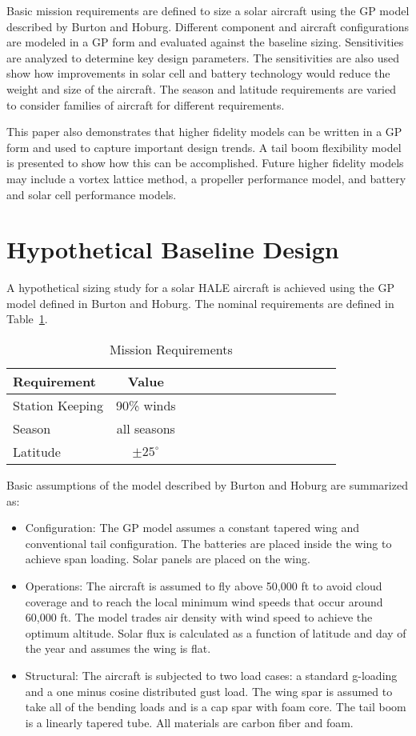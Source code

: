 \documentclass[]{aiaa-tc}%
\begin{document}
Basic mission requirements are defined to size a solar aircraft using the GP model described by Burton and Hoburg.\cite{burton_solar_2017}
Different component and aircraft configurations are modeled in a GP form and evaluated against the baseline sizing. 
Sensitivities are analyzed to determine key design parameters. 
The sensitivities are also used show how improvements in solar cell and battery technology would reduce the weight and size of the aircraft. 
The season and latitude requirements are varied to consider families of aircraft for different requirements.  

This paper also demonstrates that higher fidelity models can be written in a GP form and used to capture important design trends.  
A tail boom flexibility model is presented to show how this can be accomplished.  
Future higher fidelity models may include a vortex lattice method, a propeller performance model, and battery and solar cell performance models. 

\section{Hypothetical Baseline Design}

A hypothetical sizing study for a solar HALE aircraft is achieved using the GP model defined in Burton and Hoburg.\cite{burton_solar_2017} The nominal requirements are defined in Table~\ref{t:mreqs}.

\begin{longtable}{lccccccccccccc}
\caption{Mission Requirements}\\
\toprule
\toprule
\label{t:mreqs}
Requirement & Value \\ \hline
Station Keeping & 90\% winds \\
Season & all seasons\\
Latitude & $\pm25^{\circ}$\\
\bottomrule
\end{longtable}

Basic assumptions of the model described by Burton and Hoburg are summarized as: 

\begin{itemize}
    \item Configuration: The GP model assumes a constant tapered wing and conventional tail configuration.  The batteries are placed inside the wing to achieve span loading.  Solar panels are placed on the wing.  
    \item Operations: The aircraft is assumed to fly above 50,000 ft to avoid cloud coverage and to reach the local minimum wind speeds that occur around 60,000 ft. The model trades air density with wind speed to achieve the optimum altitude. Solar flux is calculated as a function of latitude and day of the year and assumes the wing is flat. 
    \item Structural: The aircraft is subjected to two load cases: a standard g-loading and a one minus cosine distributed gust load.  The wing spar is assumed to take all of the bending loads and is a cap spar with foam core. The tail boom is a linearly tapered tube.  All materials are carbon fiber and foam.  
    \end{itemize}
\end{document}

